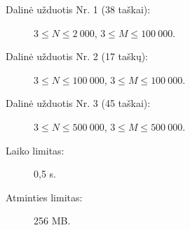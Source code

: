 \documentclass{boi2014-lt}
\begin{document}
    \Scoring

    \begin{description}
        \item[Dalinė užduotis Nr. 1 (38 taškai):]
            $3 \le N \le 2\ 000$, $3 \le M \le 100\ 000$.
        \item[Dalinė užduotis Nr. 2 (17 taškų):]
            $3 \le N \le 100\ 000$, $3 \le M \le 100\ 000$.
        \item[Dalinė užduotis Nr. 3 (45 taškai):]
            $3 \le N \le 500\ 000$, $3 \le M \le 500\ 000$.
    \end{description}

    \Constraints

    \begin{description}
        \item[Laiko limitas:] 0,5 s.
        \item[Atminties limitas:] 256 MB.
    \end{description}
\end{document}
